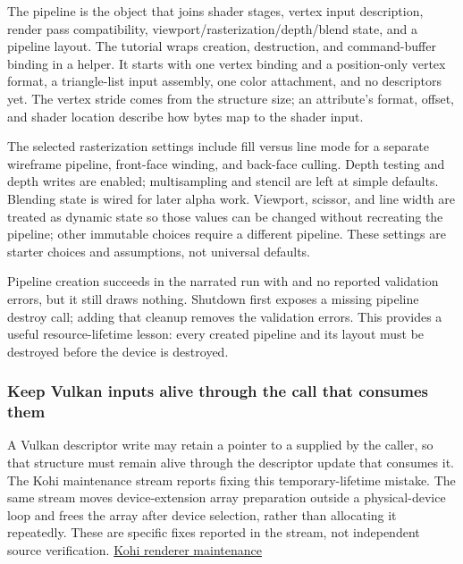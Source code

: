 \hypertarget{06-engine-ii-ch025-constructing-a-vulkan-graphics-pipeline}{}

The pipeline is the object that joins shader stages, vertex input description, render pass compatibility, viewport/rasterization/depth/blend state, and a pipeline layout. The tutorial wraps creation, destruction, and command-buffer binding in a helper. It starts with one vertex binding and a position-only vertex format, a triangle-list input assembly, one color attachment, and no descriptors yet. The vertex stride comes from the  structure size; an attribute's format, offset, and shader location describe how bytes map to the shader input.

The selected rasterization settings include fill versus line mode for a separate wireframe pipeline, front-face winding, and back-face culling. Depth testing and depth writes are enabled; multisampling and stencil are left at simple defaults. Blending state is wired for later alpha work. Viewport, scissor, and line width are treated as dynamic state so those values can be changed without recreating the pipeline; other immutable choices require a different pipeline. These settings are starter choices and assumptions, not universal defaults.

Pipeline creation succeeds in the narrated run with  and no reported validation errors, but it still draws nothing. Shutdown first exposes a missing pipeline destroy call; adding that cleanup removes the validation errors. This provides a useful resource-lifetime lesson: every created pipeline and its layout must be destroyed before the device is destroyed.

\subsubsection{Keep Vulkan inputs alive through the call that consumes them}\label{06-engine-ii-ch025-keep-vulkan-inputs-alive-through-the-call-that-consumes-them}

\hypertarget{06-engine-ii-ch025-keep-vulkan-inputs-alive-through-the-call-that-consumes-them}{}

A Vulkan descriptor write may retain a pointer to a  supplied by the caller, so that structure must remain alive through the descriptor update that consumes it. The Kohi maintenance stream reports fixing this temporary-lifetime mistake. The same stream moves device-extension array preparation outside a physical-device loop and frees the array after device selection, rather than allocating it repeatedly. These are specific fixes reported in the stream, not independent source verification. \href{https://www.youtube.com/watch?v=x8ao57nbMlY}{Kohi renderer maintenance}

